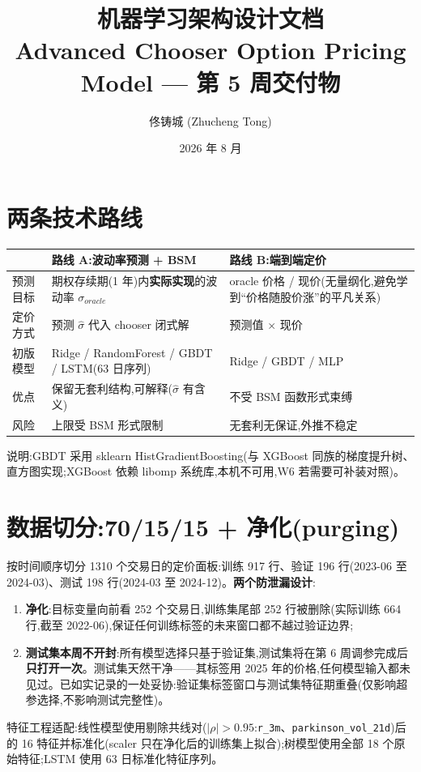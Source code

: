 \documentclass[11pt]{ctexart}
\title{\textbf{机器学习架构设计文档}\\
\large Advanced Chooser Option Pricing Model --- 第 5 周交付物}
\author{佟铸城 (Zhucheng Tong)}
\date{2026 年 8 月}
\begin{document}
\maketitle

\section{两条技术路线}
\begin{center}
\small
\begin{tabular}{p{2.0cm} p{5.6cm} p{6.4cm}}
\toprule
& \textbf{路线 A:波动率预测 + BSM} & \textbf{路线 B:端到端定价} \\
\midrule
预测目标 & 期权存续期(1 年)内\textbf{实际实现}的波动率 $\sigma_{oracle}$ & oracle 价格 / 现价(无量纲化,避免学到``价格随股价涨''的平凡关系) \\
定价方式 & 预测 $\hat\sigma$ 代入 chooser 闭式解 & 预测值 $\times$ 现价 \\
初版模型 & Ridge / RandomForest / GBDT / LSTM(63 日序列) & Ridge / GBDT / MLP \\
优点 & 保留无套利结构,可解释($\hat\sigma$ 有含义) & 不受 BSM 函数形式束缚 \\
风险 & 上限受 BSM 形式限制 & 无套利无保证,外推不稳定 \\
\bottomrule
\end{tabular}
\end{center}
说明:GBDT 采用 sklearn HistGradientBoosting(与 XGBoost 同族的梯度提升树、直方图实现;XGBoost 依赖 libomp 系统库,本机不可用,W6 若需要可补装对照)。

\section{数据切分:70/15/15 + 净化(purging)}
按时间顺序切分 1310 个交易日的定价面板:训练 917 行、验证 196 行(2023-06 至 2024-03)、测试 198 行(2024-03 至 2024-12)。\textbf{两个防泄漏设计}:
\begin{enumerate}
  \item \textbf{净化}:目标变量向前看 252 个交易日,训练集尾部 252 行被删除(实际训练 664 行,截至 2022-06),保证任何训练标签的未来窗口都不越过验证边界;
  \item \textbf{测试集本周不开封}:所有模型选择只基于验证集,测试集将在第 6 周调参完成后\textbf{只打开一次}。测试集天然干净——其标签用 2025 年的价格,任何模型输入都未见过。已如实记录的一处妥协:验证集标签窗口与测试集特征期重叠(仅影响超参选择,不影响测试完整性)。
\end{enumerate}
特征工程适配:线性模型使用剔除共线对($|\rho|>0.95$:\texttt{r\_3m}、\texttt{parkinson\_vol\_21d})后的 16 特征并标准化(scaler 只在净化后的训练集上拟合);树模型使用全部 18 个原始特征;LSTM 使用 63 日标准化特征序列。
\end{document}

